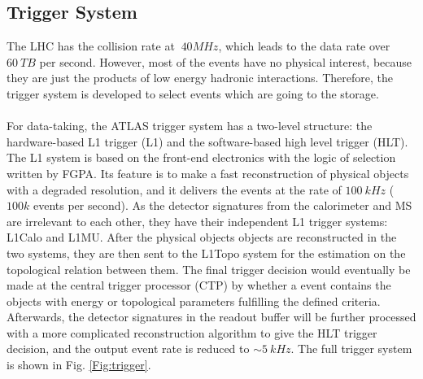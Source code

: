 \subsection{Trigger System}
The LHC has the collision rate at $~40MHz$, which leads to the data rate over $60~TB$ per second. However, most of the events have no physical interest, because they are just the products of low energy hadronic interactions. Therefore, the trigger system is developed to select events which are going to the storage.
\\
\\For data-taking, the ATLAS trigger system has a two-level structure: the hardware-based L1 trigger (L1) and the software-based high level trigger (HLT). The L1 system is based on the front-end electronics with the logic of selection written by FGPA. Its feature is to make a fast reconstruction of physical objects with a degraded resolution, and it delivers the events at the rate of $100~kHz$ ($100k$ events per second). As the detector signatures from the calorimeter and MS are irrelevant to each other, they have their independent L1 trigger systems: L1Calo and L1MU. After the physical objects objects are reconstructed in the two systems, they are then sent to the L1Topo system for the estimation on the topological relation between them. The final trigger decision would eventually be made at the central trigger processor (CTP) by whether a event contains the objects with energy or topological parameters fulfilling the defined criteria. Afterwards, the detector signatures in the readout buffer will be further processed with a more complicated reconstruction algorithm to give the HLT trigger decision, and the output event rate is reduced to $\sim 5~kHz$. The full trigger system is shown in Fig. \ref{Fig:trigger}.

